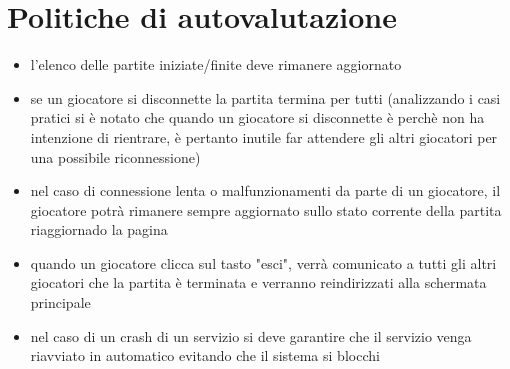 \section{Politiche di autovalutazione} 
\begin{itemize}
    \item l'elenco delle partite iniziate/finite deve rimanere aggiornato
    \item se un giocatore si disconnette la partita termina per tutti (analizzando i casi pratici si è notato che quando un giocatore si disconnette è perchè non ha intenzione di rientrare, è pertanto inutile far attendere gli altri giocatori per una possibile riconnessione)
    \item nel caso di connessione lenta o malfunzionamenti da parte di un giocatore, il giocatore potrà rimanere sempre aggiornato sullo stato corrente della partita riaggiornado la pagina
    \item quando un giocatore clicca sul tasto "esci", verrà comunicato a tutti gli altri giocatori che la partita è terminata e verranno reindirizzati alla schermata principale
    \item nel caso di un crash di un servizio si deve garantire che il servizio venga riavviato in automatico evitando che il sistema si blocchi
\end{itemize}

